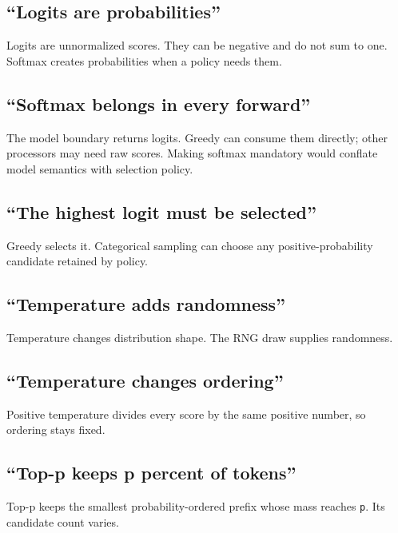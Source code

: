 \subsection{``Logits are
probabilities''}\label{logits-are-probabilities}

Logits are unnormalized scores. They can be negative and do not sum to
one. Softmax creates probabilities when a policy needs them.

\subsection{``Softmax belongs in every
forward''}\label{softmax-belongs-in-every-forward}

The model boundary returns logits. Greedy can consume them directly;
other processors may need raw scores. Making softmax mandatory would
conflate model semantics with selection policy.

\subsection{``The highest logit must be
selected''}\label{the-highest-logit-must-be-selected}

Greedy selects it. Categorical sampling can choose any
positive-probability candidate retained by policy.

\subsection{``Temperature adds
randomness''}\label{temperature-adds-randomness}

Temperature changes distribution shape. The RNG draw supplies
randomness.

\subsection{``Temperature changes
ordering''}\label{temperature-changes-ordering}

Positive temperature divides every score by the same positive number, so
ordering stays fixed.

\subsection{``Top-p keeps p percent of
tokens''}\label{top-p-keeps-p-percent-of-tokens}

Top-p keeps the smallest probability-ordered prefix whose mass reaches
\texttt{p}. Its candidate count varies.

